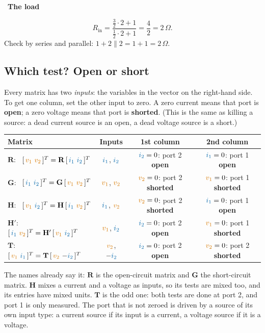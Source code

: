 \documentclass[11pt,a4paper]{article}
\newcommand{\Icol}[1]{\textcolor{ccur}{#1}}
\newcommand{\Vcol}[1]{\textcolor{cvolt}{#1}}
\newif\ifsolfirst
\newcommand{\solstep}[2]{\par\ifsolfirst\global\solfirstfalse\else\bigskip\needspace{5\baselineskip}\fi
  \noindent{\color{cpow}\bfseries Step #1.}\ {\bfseries #2}\par\nobreak\smallskip}
\newcommand{\ohm}{\,\Omega}
\newcommand{\yes}{\textcolor{cpow}{\checkmark}}
\newcommand{\vone}{\Vcol{v_1}}  \newcommand{\vtwo}{\Vcol{v_2}}
\newcommand{\ione}{\Icol{i_1}}  \newcommand{\itwo}{\Icol{i_2}}
\newcommand{\Rm}{\mathbf{R}}  \newcommand{\Gm}{\mathbf{G}}
\newcommand{\Hm}{\mathbf{H}}  \newcommand{\Tm}{\mathbf{T}}
\begin{document}
\solstep{3}{The load}
\[
  R_{\mathrm{in}} = \frac{\frac32 \cdot 2 + 1}{\frac12 \cdot 2 + 1} = \frac{4}{2} = 2\ohm .
\]
Check by series and parallel: $1 + 2 \parallel 2 = 1 + 1 = 2\ohm$. \ \yes

\subsection*{Which test? Open or short}

Every matrix has two \emph{inputs}: the variables in the vector on the right-hand side. To get
one column, set the other input to zero. A zero current means that port is \textbf{open}; a
zero voltage means that port is \textbf{shorted}. (This is the same as killing a source: a dead
current source is an open, a dead voltage source is a short.)

\begin{center}
\small
\renewcommand{\arraystretch}{1.35}
\begin{tabular}{@{}l c c c@{}}
\toprule
\textbf{Matrix} & \textbf{Inputs} & \textbf{1st column} & \textbf{2nd column}\\
\midrule
$\Rm$: \ $[\,\vone \ \vtwo\,]^T = \Rm\,[\,\ione \ \itwo\,]^T$ & $\ione$, $\itwo$ & $\itwo = 0$: port 2 \textbf{open} & $\ione = 0$: port 1 \textbf{open}\\
$\Gm$: \ $[\,\ione \ \itwo\,]^T = \Gm\,[\,\vone \ \vtwo\,]^T$ & $\vone$, $\vtwo$ & $\vtwo = 0$: port 2 \textbf{shorted} & $\vone = 0$: port 1 \textbf{shorted}\\
$\Hm$: \ $[\,\vone \ \itwo\,]^T = \Hm\,[\,\ione \ \vtwo\,]^T$ & $\ione$, $\vtwo$ & $\vtwo = 0$: port 2 \textbf{shorted} & $\ione = 0$: port 1 \textbf{open}\\
$\Hm'$: \ $[\,\ione \ \vtwo\,]^T = \Hm'\,[\,\vone \ \itwo\,]^T$ & $\vone$, $\itwo$ & $\itwo = 0$: port 2 \textbf{open} & $\vone = 0$: port 1 \textbf{shorted}\\
$\Tm$: \ $[\,\vone \ \ione\,]^T = \Tm\,[\,\vtwo \ {-\itwo}\,]^T$ & $\vtwo$, $-\itwo$ & $\itwo = 0$: port 2 \textbf{open} & $\vtwo = 0$: port 2 \textbf{shorted}\\
\bottomrule
\end{tabular}
\end{center}

The names already say it: $\Rm$ is the open-circuit matrix and $\Gm$ the short-circuit matrix.
$\Hm$ mixes a current and a voltage as inputs, so its tests are mixed too, and its entries have
mixed units. $\Tm$ is the odd one: both tests are done at port 2, and port 1 is only measured.
The port that is not zeroed is driven by a source of its own input type: a current source if
its input is a current, a voltage source if it is a voltage.
\end{document}
